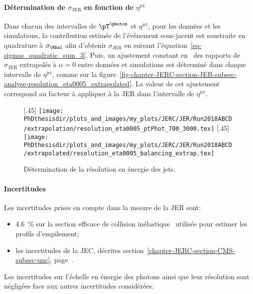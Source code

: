 \paragraph{Détermination de $\sigma_\text{JER}$ en fonction de $\eta^\text{jet}$}
Dans chacun des intervalles de $\pT^{\photon}$ et $\eta^\text{jet}$, pour les données et les simulations, la contribution estimée de l'événement sous-jacent est soustraite en quadrature à $\sigma_{\Rbal}$ afin d'obtenir $\sigma_\text{JER}$ en suivant l'équation~\eqref{eq-sigmas_quadratic_sum_3}.
Puis, un ajustement constant en \pT\ des rapports de $\sigma_\text{JER}$ extrapolés à $\alpha=0$ entre données et simulations est déterminé dans chaque intervalle de $\eta^\text{jet}$, comme sur la figure~\ref{fig-chapter-JERC-section-JER-subsec-analyse-resolution_eta0005_extrapolated}.
La valeur de cet ajustement correspond au facteur à appliquer à la JER dans l'intervalle de $\eta^\text{jet}$.
\begin{figure}[h]
\centering
{}[.45\textwidth]
{\texttt{[image: \\PhDthesisdir/plots\_and\_images/my\_plots/JERC/JER/Run2018ABCD/extrapolation/resolution\_eta0005\_ptPhot\_700\_3000.tex]}}
\hfill
{}[.45\textwidth]
{\texttt{[image: \\PhDthesisdir/plots\_and\_images/my\_plots/JERC/JER/Run2018ABCD/extrapolated/resolution\_eta0005\_balancing\_extrap.tex]}}

\caption{Détermination de la résolution en énergie des jets.}
\end{figure}
\paragraph{Incertitudes}
Les incertitudes prises en compte dans la mesure de la JER sont:
\begin{itemize}
\item \SI{4.6}{\%} sur la section efficace de collision inélastique \proton\proton\ utilisée pour estimer les profils d'empilement;
\item les incertitudes de la JEC, décrites section~\ref{chapter-JERC-section-CMS-subsec-unc}, page~\pageref{chapter-JERC-section-CMS-subsec-unc}.
\end{itemize}
Les incertitudes sur l'échelle en énergie des photons ainsi que leur résolution sont négligées face aux autres incertitudes considérées.
